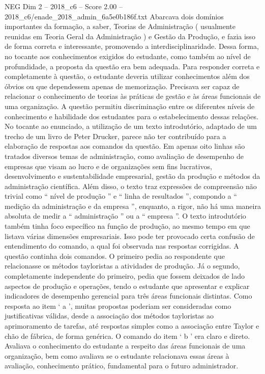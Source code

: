 \begin{textsample}{NEG Dim 2 – 2018\_c6 – Score 2.00 – 2018\_c6/enade\_2018\_admin\_6a5e0b186f.txt}
Abarcava dois domínios importantes da formação, a saber, Teorias de Administração ( usualmente reunidas em Teoria Geral da Administração ) e Gestão da Produção, e fazia isso de forma correta e interessante, promovendo a interdisciplinaridade.
Dessa forma, no tocante aos conhecimentos exigidos do estudante, como também ao nível de profundidade, a proposta da questão era bem adequada.
Para responder correta e completamente à questão, o estudante deveria utilizar conhecimentos além dos óbvios ou que dependessem apenas de memorização.
Precisava ser capaz de relacionar o conhecimento de teorias às práticas de gestão e às áreas funcionais de uma organização.
A questão permitiu discriminação entre os diferentes níveis de conhecimento e habilidade dos estudantes para o estabelecimento dessas relações.
No tocante ao enunciado, a utilização de um texto introdutório, adaptado de um trecho de um livro de Peter Drucker, parece não ter contribuído para a elaboração de respostas aos comandos da questão.
Em apenas oito linhas são tratados diversos temas de administração, como avaliação de desempenho de empresas que visam ao lucro e de organizações sem fins lucrativos, desenvolvimento e sustentabilidade empresarial, gestão da produção e métodos da administração científica.
Além disso, o texto traz expressões de compreensão não trivial como “ nível de produção ” e “ linha de resultados ”, compondo a “ medição da administração e da empresa ”, enquanto, a rigor, não há uma maneira absoluta de medir a “ administração ” ou a “ empresa ”.
O texto introdutório também tinha foco específico na função de produção, ao mesmo tempo em que listava várias dimensões empresariais.
Isso pode ter provocado certa confusão de entendimento do comando, a qual foi observada nas respostas corrigidas.
A questão continha dois comandos.
O primeiro pedia ao respondente que relacionasse os métodos tayloristas a atividades de produção.
Já o segundo, completamente independente do primeiro, pedia que fossem deixados de lado aspectos de produção e operações, tendo o estudante que apresentar e explicar indicadores de desempenho gerencial para três áreas funcionais distintas.
Como resposta ao item ‘ a ’, muitas propostas poderiam ser consideradas como justificativas válidas, desde a associação dos métodos tayloristas ao aprimoramento de tarefas, até respostas simples como a associação entre Taylor e chão de fábrica, de forma genérica.
O comando do item ‘ b ’ era claro e direto.
Avaliava o conhecimento do estudante a respeito das áreas funcionais de uma organização, bem como avaliava se o estudante relacionava essas áreas à avaliação, conhecimento prático, fundamental para o futuro administrador.

\end{textsample}
